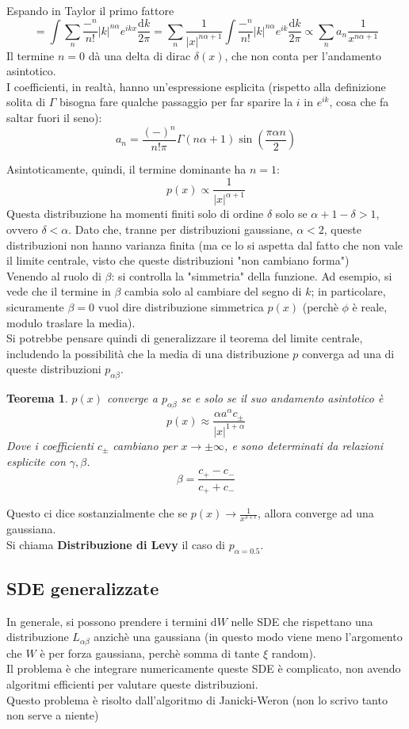 \documentclass[a4paper,12pt]{article}
\theoremstyle{plain}
\newtheorem{thm}{Teorema}[section]
\theoremstyle{definition}
\newcommand{\f}[2]{\frac{#1}{#2}}
\renewcommand{\d}{\text{d}}
\newcommand{\ra}{\rightarrow}
\theoremstyle{remark}
\begin{document}
Espando in Taylor il primo fattore
\[=\int \sum_n \f{-^n}{n!}|k|^{n\alpha}e^{ikx}	\f{\d k}{2 \pi}	=\sum_n\f{1}{|x|^{n\alpha+1}}\int  \f{-^n}{n!}|k|^{n\alpha}e^{ik}	\f{\d k}{2 \pi}\propto\sum_n a_n\f{1}{x^{n\alpha+1}}\]
Il termine $n=0$ dà una delta di dirac $\delta(x)$, che non conta per l'andamento asintotico.\\
I coefficienti, in realtà, hanno un'espressione esplicita (rispetto alla definizione solita di $\Gamma$ bisogna fare qualche passaggio per far sparire la $i$ in $e^{ik}$, cosa che fa saltar fuori il seno):
\[a_n=\f{(-)^n}{n!\pi}\Gamma(n\alpha+1)\sin(\f{\pi \alpha n}{2})\]

Asintoticamente, quindi, il termine dominante ha $n=1$:
\[p(x)\propto\f{1}{|x|^{\alpha+1}}\]
Questa distribuzione ha momenti finiti solo di ordine $\delta$ solo se $\alpha+1-\delta > 1$, ovvero $\delta<\alpha$. Dato che, tranne per distribuzioni gaussiane, $\alpha<2$, queste distribuzioni non hanno varianza finita (ma ce lo si aspetta dal fatto che non vale il limite centrale, visto che queste distribuzioni "non cambiano forma")\\ Venendo al ruolo di $\beta$: si controlla la "simmetria" della funzione. Ad esempio, si vede che il termine in $\beta$ cambia solo al cambiare del segno di $k$; in particolare, sicuramente $\beta=0$ vuol dire distribuzione simmetrica $p(x)$ (perchè $\phi$ è reale, modulo traslare la media).
\\ Si potrebbe pensare quindi di generalizzare il teorema del limite centrale, includendo la possibilità che la media di una distribuzione $p$ converga ad una di queste distribuzioni $p_{\alpha\beta}$.
\begin{thm}
$p(x)		$ converge a $p_{\alpha\beta}$ se e solo se il suo andamento asintotico è
\[p(x)\approx	\f{\alpha a^{\alpha} c_\pm}{|x|^{1+\alpha}}		\]
Dove i coefficienti $c_{\pm}$ cambiano per $x\ra\pm\infty$, e sono determinati da relazioni esplicite con $\gamma,\beta$.
\[\beta=\f{c_+-c_-}{c_++c_-}\]


\end{thm}
Questo ci dice sostanzialmente che se $p(x)\ra \f{1}{x^{3+\epsilon}}$, allora converge ad una gaussiana.\\Si chiama \textbf{Distribuzione di Levy} il caso di $p_{\alpha=0.5}$.\subsection{SDE generalizzate}
In generale, si possono prendere i termini $\d W$ nelle SDE che rispettano una distribuzione $L_{\alpha\beta}$ anzichè una gaussiana (in questo modo viene meno l'argomento che $W$ è per forza gaussiana, perchè somma di tante $\xi$ random).\\Il problema è che integrare numericamente queste SDE è complicato, non avendo algoritmi efficienti per valutare queste distribuzioni. \\Questo problema è risolto dall'algoritmo di Janicki-Weron (non lo scrivo tanto non serve a niente)
\end{document}
